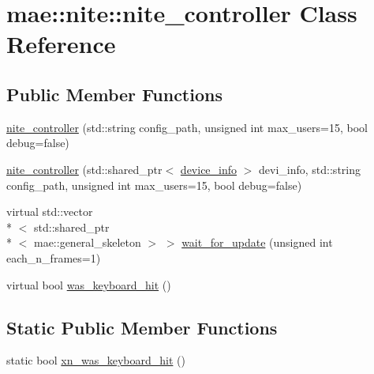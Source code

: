 \hypertarget{classmae_1_1nite_1_1nite__controller}{\section{mae\-:\-:nite\-:\-:nite\-\_\-controller Class Reference}
\label{classmae_1_1nite_1_1nite__controller}
}
\subsection*{Public Member Functions}
\begin{DoxyCompactItemize}
\item 
\hyperlink{classmae_1_1nite_1_1nite__controller_a57102a75fb84fb61e2b984012cbb3e3d}{nite\-\_\-controller} (std\-::string config\-\_\-path, unsigned int max\-\_\-users=15, bool debug=false)
\item 
\hyperlink{classmae_1_1nite_1_1nite__controller_aa9893d8cef1710166e74680868864340}{nite\-\_\-controller} (std\-::shared\-\_\-ptr$<$ \hyperlink{classmae_1_1nite_1_1device__info}{device\-\_\-info} $>$ devi\-\_\-info, std\-::string config\-\_\-path, unsigned int max\-\_\-users=15, bool debug=false)
\item 
virtual std\-::vector\\*
$<$ std\-::shared\-\_\-ptr\\*
$<$ mae\-::general\-\_\-skeleton $>$ $>$ \hyperlink{classmae_1_1nite_1_1nite__controller_a1a421a0c7e3c85b1ad51bf02024a0621}{wait\-\_\-for\-\_\-update} (unsigned int each\-\_\-n\-\_\-frames=1)
\item 
virtual bool \hyperlink{classmae_1_1nite_1_1nite__controller_abce55c613c5ab51b839b89f40dba9564}{was\-\_\-keyboard\-\_\-hit} ()
\end{DoxyCompactItemize}
\subsection*{Static Public Member Functions}
\begin{DoxyCompactItemize}
\item 
static bool \hyperlink{classmae_1_1nite_1_1nite__controller_adb0221b3c31c8209450641ace0224c9d}{xn\-\_\-was\-\_\-keyboard\-\_\-hit} ()
\end{DoxyCompactItemize}
